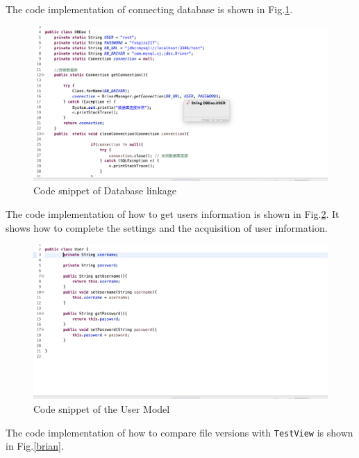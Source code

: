 \vspace{0.3cm}
\noindent The code implementation of connecting database is shown in Fig.\ref{aa}.

\begin{figure}[H]
  \centering
  \includegraphics[width=.8\textwidth]{lianjie.png}%
  \caption{Code snippet of Database linkage} %
  \label{aa} %
\end{figure}

\vspace{0.3cm}
\noindent The code implementation of how to get users information is shown in Fig.\ref{a1a}. It shows how to complete the settings and the acquisition of user information.

\begin{figure}[H]
  \centering
  \includegraphics[width=.8\textwidth]{USERMODEL.png}%
  \caption{Code snippet of the User Model} %
  \label{a1a} %
\end{figure}

\vspace{0.3cm}
\noindent The code implementation of how to compare file versions with \texttt{TestView} is shown in Fig.\ref{brian}. 


